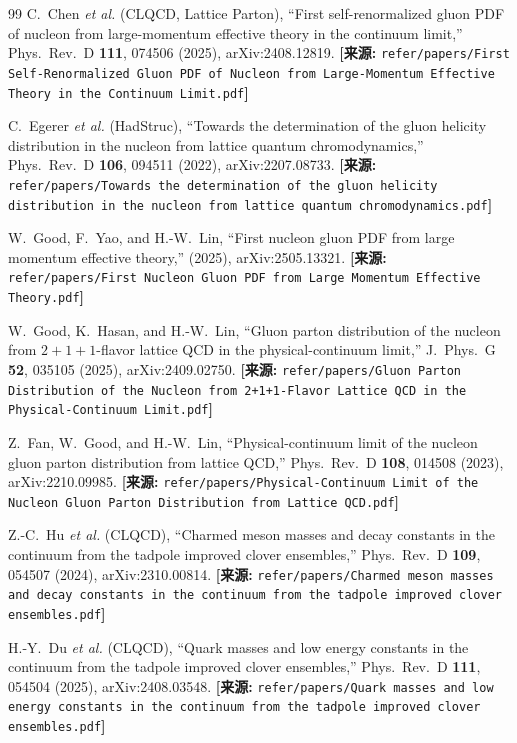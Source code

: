 \documentclass[12pt,a4paper]{ctexart}
\theoremstyle{definition}
\begin{document}
\begin{thebibliography}{99}
C.~Chen \textit{et al.} (CLQCD, Lattice Parton),
``First self-renormalized gluon PDF of nucleon from large-momentum effective theory in the continuum limit,''
Phys.\ Rev.\ D \textbf{111}, 074506 (2025), arXiv:2408.12819.
\quad\textbf{[来源:} \texttt{refer/papers/First Self-Renormalized Gluon PDF of Nucleon from Large-Momentum Effective Theory in the Continuum Limit.pdf}\textbf{]}

C.~Egerer \textit{et al.} (HadStruc),
``Towards the determination of the gluon helicity distribution in the nucleon from lattice quantum chromodynamics,''
Phys.\ Rev.\ D \textbf{106}, 094511 (2022), arXiv:2207.08733.
\quad\textbf{[来源:} \texttt{refer/papers/Towards the determination of the gluon helicity distribution in the nucleon from lattice quantum chromodynamics.pdf}\textbf{]}

W.~Good, F.~Yao, and H.-W.~Lin,
``First nucleon gluon PDF from large momentum effective theory,''
(2025), arXiv:2505.13321.
\quad\textbf{[来源:} \texttt{refer/papers/First Nucleon Gluon PDF from Large Momentum Effective Theory.pdf}\textbf{]}

W.~Good, K.~Hasan, and H.-W.~Lin,
``Gluon parton distribution of the nucleon from $2+1+1$-flavor lattice QCD in the physical-continuum limit,''
J.\ Phys.\ G \textbf{52}, 035105 (2025), arXiv:2409.02750.
\quad\textbf{[来源:} \texttt{refer/papers/Gluon Parton Distribution of the Nucleon from 2+1+1-Flavor Lattice QCD in the Physical-Continuum Limit.pdf}\textbf{]}

Z.~Fan, W.~Good, and H.-W.~Lin,
``Physical-continuum limit of the nucleon gluon parton distribution from lattice QCD,''
Phys.\ Rev.\ D \textbf{108}, 014508 (2023), arXiv:2210.09985.
\quad\textbf{[来源:} \texttt{refer/papers/Physical-Continuum Limit of the Nucleon Gluon Parton Distribution from Lattice QCD.pdf}\textbf{]}

Z.-C.~Hu \textit{et al.} (CLQCD),
``Charmed meson masses and decay constants in the continuum from the tadpole improved clover ensembles,''
Phys.\ Rev.\ D \textbf{109}, 054507 (2024), arXiv:2310.00814.
\quad\textbf{[来源:} \texttt{refer/papers/Charmed meson masses and decay constants in the continuum from the tadpole improved clover ensembles.pdf}\textbf{]}

H.-Y.~Du \textit{et al.} (CLQCD),
``Quark masses and low energy constants in the continuum from the tadpole improved clover ensembles,''
Phys.\ Rev.\ D \textbf{111}, 054504 (2025), arXiv:2408.03548.
\quad\textbf{[来源:} \texttt{refer/papers/Quark masses and low energy constants in the continuum from the tadpole improved clover ensembles.pdf}\textbf{]}


\end{thebibliography}
\end{document}
